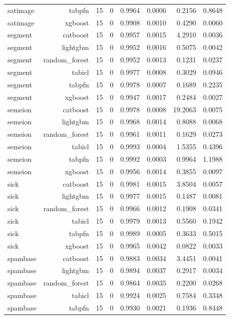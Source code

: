 \begin{table}[htbp]
\begin{tabular}{lrrrrrrr}
satimage & tabpfn & 15 & 0 & 0.9964 & 0.0006 & 0.2156 & 0.8648 \\
satimage & xgboost & 15 & 0 & 0.9908 & 0.0010 & 0.4290 & 0.0060 \\
segment & catboost & 15 & 0 & 0.9957 & 0.0015 & 4.2910 & 0.0036 \\
segment & lightgbm & 15 & 0 & 0.9952 & 0.0016 & 0.5075 & 0.0042 \\
segment & random\_forest & 15 & 0 & 0.9952 & 0.0013 & 0.1231 & 0.0237 \\
segment & tabicl & 15 & 0 & 0.9977 & 0.0008 & 0.3029 & 0.0946 \\
segment & tabpfn & 15 & 0 & 0.9978 & 0.0007 & 0.1689 & 0.2235 \\
segment & xgboost & 15 & 0 & 0.9947 & 0.0017 & 0.2484 & 0.0027 \\
semeion & catboost & 15 & 0 & 0.9978 & 0.0008 & 19.2063 & 0.0075 \\
semeion & lightgbm & 15 & 0 & 0.9968 & 0.0014 & 0.8088 & 0.0068 \\
semeion & random\_forest & 15 & 0 & 0.9961 & 0.0011 & 0.1629 & 0.0273 \\
semeion & tabicl & 15 & 0 & 0.9993 & 0.0004 & 1.5355 & 0.4396 \\
semeion & tabpfn & 15 & 0 & 0.9992 & 0.0003 & 0.9964 & 1.1988 \\
semeion & xgboost & 15 & 0 & 0.9956 & 0.0014 & 0.3855 & 0.0097 \\
sick & catboost & 15 & 0 & 0.9981 & 0.0015 & 3.8504 & 0.0057 \\
sick & lightgbm & 15 & 0 & 0.9977 & 0.0015 & 0.1487 & 0.0081 \\
sick & random\_forest & 15 & 0 & 0.9966 & 0.0012 & 0.1908 & 0.0341 \\
sick & tabicl & 15 & 0 & 0.9979 & 0.0013 & 0.5560 & 0.1942 \\
sick & tabpfn & 15 & 0 & 0.9989 & 0.0005 & 0.3633 & 0.5015 \\
sick & xgboost & 15 & 0 & 0.9965 & 0.0042 & 0.0822 & 0.0033 \\
spambase & catboost & 15 & 0 & 0.9883 & 0.0034 & 3.4451 & 0.0041 \\
spambase & lightgbm & 15 & 0 & 0.9894 & 0.0037 & 0.2917 & 0.0034 \\
spambase & random\_forest & 15 & 0 & 0.9864 & 0.0035 & 0.2200 & 0.0268 \\
spambase & tabicl & 15 & 0 & 0.9924 & 0.0025 & 0.7584 & 0.3348 \\
spambase & tabpfn & 15 & 0 & 0.9930 & 0.0021 & 0.1936 & 0.8448 \\

\end{tabular}
\end{table}
